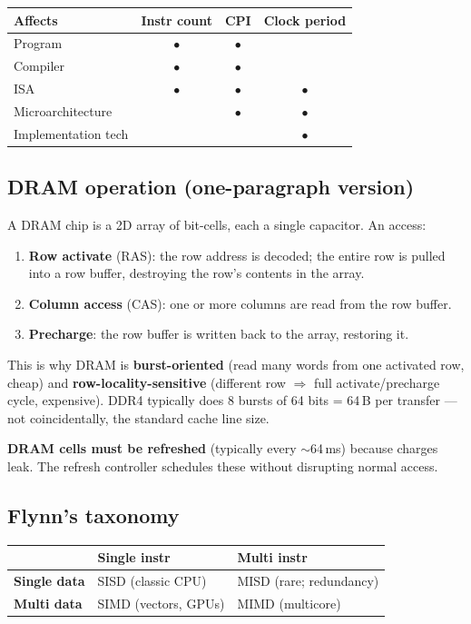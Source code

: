 \documentclass[11pt,a4paper]{article}
\begin{document}
\begin{center}
\begin{tabular}{lccc}
\hline
\textbf{Affects} & \textbf{Instr count} & \textbf{CPI} & \textbf{Clock period} \\
\hline
Program             & $\bullet$ & $\bullet$ & \\
Compiler            & $\bullet$ & $\bullet$ & \\
ISA                 & $\bullet$ & $\bullet$ & $\bullet$ \\
Microarchitecture   &           & $\bullet$ & $\bullet$ \\
Implementation tech &           &           & $\bullet$ \\
\hline
\end{tabular}
\end{center}

\subsection{DRAM operation (one-paragraph version)}

A DRAM chip is a 2D array of bit-cells, each a single capacitor. An access:
\begin{enumerate}[leftmargin=*,itemsep=1pt]
  \item \textbf{Row activate} (RAS): the row address is decoded; the entire row is pulled into a row buffer, destroying the row's contents in the array.
  \item \textbf{Column access} (CAS): one or more columns are read from the row buffer.
  \item \textbf{Precharge}: the row buffer is written back to the array, restoring it.
\end{enumerate}
This is why DRAM is \textbf{burst-oriented} (read many words from one activated row, cheap) and \textbf{row-locality-sensitive} (different row $\Rightarrow$ full activate/precharge cycle, expensive). DDR4 typically does 8 bursts of 64 bits = 64\,B per transfer --- not coincidentally, the standard cache line size.

\textbf{DRAM cells must be refreshed} (typically every $\sim$64\,ms) because charges leak. The refresh controller schedules these without disrupting normal access.

\subsection{Flynn's taxonomy}

\begin{center}
\begin{tabular}{lll}
\hline
& \textbf{Single instr} & \textbf{Multi instr} \\
\hline
\textbf{Single data}  & SISD (classic CPU) & MISD (rare; redundancy) \\
\textbf{Multi data}   & SIMD (vectors, GPUs) & MIMD (multicore) \\
\hline
\end{tabular}
\end{center}
\end{document}

